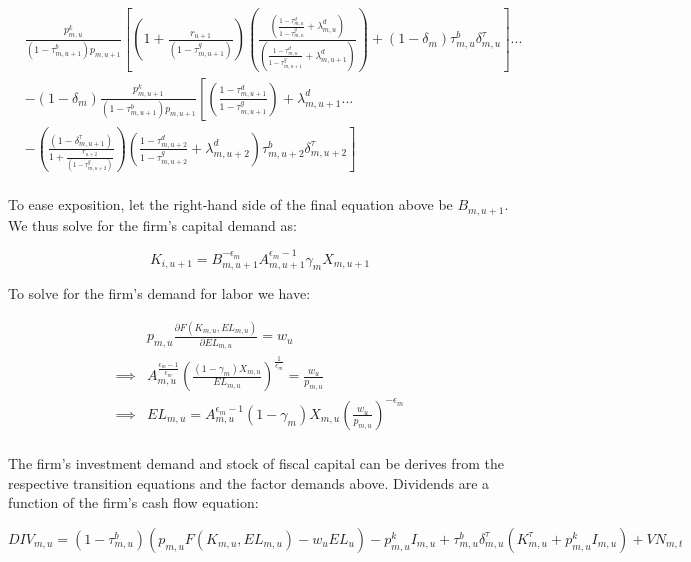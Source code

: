 \documentclass[letterpaper,12pt]{article}
\theoremstyle{definition}
\begin{document}
\begin{spacing}{1.5}
\begin{equation}
\begin{split}
&\frac{p^{k}_{m,u}}{(1-\tau^{b}_{m,u+1})p_{m,u+1}}\left[ \left(1+\frac{r_{u+1}}{(1-\tau^{g}_{m,u+1})}\right) \left( \frac{\left(\frac{1-\tau^{d}_{m,u}}{1-\tau^{g}_{m,u}}+\lambda^{d}_{m,u}\right)}{\left(\frac{1-\tau^{d}_{m,u}}{1-\tau^{g}_{m,u+1}}+\lambda^{d}_{m,u+1}\right)} \right)+ (1-\delta_{m})\tau^{b}_{m,u}\delta^{\tau}_{m,u}\right] ... \\
& -(1-\delta_{m})\frac{p^{k}_{m,u+1}}{(1-\tau^{b}_{m,u+1})p_{m,u+1}}\left[\left(\frac{1-\tau^{d}_{m,u+1}}{1-\tau^{g}_{m,u+1}}\right) + \lambda^{d}_{m,u+1} ... \right. \\
& \left.  -  \left(\frac{(1-\delta^{\tau}_{m,u+1})}{1+\frac{r_{u+2}}{(1-\tau^{g}_{m,u+2})}}\right)  \left(\frac{1-\tau^{d}_{m,u+2}}{1-\tau^{g}_{m,u+2}}+\lambda^{d}_{m,u+2}\right)\tau^{b}_{m,u+2}\delta^{\tau}_{m,u+2} \right]  \\
\end{split}
\end{equation}


To ease exposition, let the right-hand side of the final equation above be $B_{m,u+1}$.  We thus solve for the firm's capital demand as:

\begin{equation}
\label{eqn:cap_demand_tax}
K_{i,u+1} = B_{m,u+1}^{-\epsilon_{m}}A_{m,u+1}^{\epsilon_{m}-1}\gamma_{m}X_{m,u+1}
\end{equation}

To solve for the firm's demand for labor we have:

\begin{equation}
\label{eqn:solve_l_demand_tax}
\begin{split}
   & p_{m,u}\frac{\partial F(K_{m,u},EL_{m,u})}{\partial EL_{m,u}} = w_{u}  \\
 \implies & A_{m,u}^{\frac{\epsilon_{m}-1}{\epsilon_{m}}}\left(\frac{(1-\gamma_{m})X_{m,u}}{EL_{m,u}}\right)^{\frac{1}{\epsilon_{m}}} = \frac{w_{u}}{p_{m,u}} \\
 \implies &  EL_{m,u}  = A_{m,u}^{\epsilon_{m}-1}(1-\gamma_{m})X_{m,u}\left(\frac{w_{u}}{p_{m,u}}\right)^{-\epsilon_{m}} \\ 
\end{split}
\end{equation}

The firm's investment demand and stock of fiscal capital can be derives from the respective transition equations and the factor demands above.  Dividends are a function of the firm's cash flow equation:

\begin{equation}
DIV_{m,u} = (1-\tau^{b}_{m,u})\left(p_{m,u}F(K_{m,u},EL_{m,u})-w_{u}EL_{u}\right) - p^{k}_{m,u}I_{m,u}+\tau^{b}_{m,u}\delta^{\tau}_{m,u}(K^{\tau}_{m,u}+p^{k}_{m,u}I_{m,u})+VN_{m,t}
\end{equation}


\end{spacing}
\end{document}

